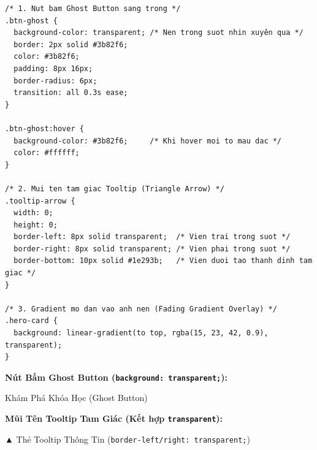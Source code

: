 \documentclass[11pt,oneside]{book}
\newcommand{\codeinline}[1]{\textcolor{accentOrange}{\texttt{#1}}}
\begin{document}
\begin{codeWindow}
\begin{lstlisting}[language=CSS3]
/* 1. Nut bam Ghost Button sang trong */
.btn-ghost {
  background-color: transparent; /* Nen trong suot nhin xuyên qua */
  border: 2px solid #3b82f6;
  color: #3b82f6;
  padding: 8px 16px;
  border-radius: 6px;
  transition: all 0.3s ease;
}

.btn-ghost:hover {
  background-color: #3b82f6;     /* Khi hover moi to mau dac */
  color: #ffffff;
}

/* 2. Mui ten tam giac Tooltip (Triangle Arrow) */
.tooltip-arrow {
  width: 0;
  height: 0;
  border-left: 8px solid transparent;  /* Vien trai trong suot */
  border-right: 8px solid transparent; /* Vien phai trong suot */
  border-bottom: 10px solid #1e293b;   /* Vien duoi tao thanh dinh tam giac */
}

/* 3. Gradient mo dan vao anh nen (Fading Gradient Overlay) */
.hero-card {
  background: linear-gradient(to top, rgba(15, 23, 42, 0.9), transparent);
}
\end{lstlisting}
\end{codeWindow}

\begin{browserWindow}
\vspace{2pt}
\begin{tcolorbox}[
    enhanced,
    colback=gray!5,
    colframe=gray!30,
    arc=6pt, boxrule=0.8pt,
    top=10pt, bottom=10pt, left=12pt, right=12pt
]
  {\sffamily\bfseries\color{primaryBlue} Nút Bấm Ghost Button (\codeinline{background: transparent;}):}\\[4pt]
  \begin{tcolorbox}[nobeforeafter, colback=gray!5, colframe=blue!70!black, arc=4pt, boxrule=1.2pt, top=4pt, bottom=4pt, left=10pt, right=10pt, fontupper=\sffamily\bfseries\small\color{blue!70!black}]
    Khám Phá Khóa Học (Ghost Button)
  \end{tcolorbox}
  \vspace{6pt}
  
  {\sffamily\bfseries\color{primaryBlue} Mũi Tên Tooltip Tam Giác (Kết hợp \codeinline{transparent}):}\\[4pt]
  \begin{tcolorbox}[nobeforeafter, colback=gray!90!black, colframe=gray!90!black, arc=3pt, boxrule=0.4pt, top=4pt, bottom=4pt, left=10pt, right=10pt, fontupper=\sffamily\bfseries\scriptsize\color{white}]
    ▲ \quad Thẻ Tooltip Thông Tin (\codeinline{border-left/right: transparent;})
  \end{tcolorbox}
\end{tcolorbox}
\end{browserWindow}
\end{document}
